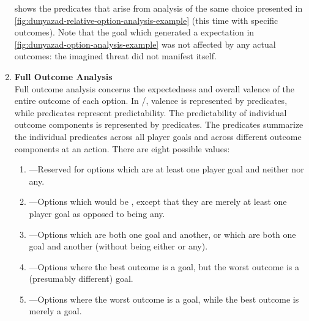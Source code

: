 \begin{enumerate}[leftmargin=1.4em]
 shows the  predicates that arise from analysis of the same choice presented in \cref{fig:dunyazad-relative-option-analysis-example} (this time with specific outcomes).
%
Note that the  goal which generated a  expectation in \cref{fig:dunyazad-option-analysis-example}{} was not affected by any actual outcomes: the imagined threat did not manifest itself.

\item %
\textbf{Full Outcome Analysis} \\
%
Full outcome analysis concerns the expectedness and overall valence of the entire outcome of each option.
%
In \dunyazad/, valence is represented by  predicates, while  predicates represent predictability.
%
The predictability of individual outcome components is represented by  predicates.
%
The  predicates summarize the individual  predicates across all player goals and across different outcome components at an action.
%
There are eight possible  values:
%
\begin{enumerate}
  \item {}---Reserved for options which are  at least one player goal and neither  nor  any.
  \item {}---Options which would be , except that they are merely  at least one player goal as opposed to being  any.
  \item {}---Options which are both  one goal and  another, or which are both  one goal and  another (without being either  or  any).
  \item {}---Options where the best outcome is  a goal, but the worst outcome is  a (presumably different) goal.
\item {}---Options where the worst outcome is  a goal, while the best outcome is merely  a goal.

\end{enumerate}
\end{enumerate}
